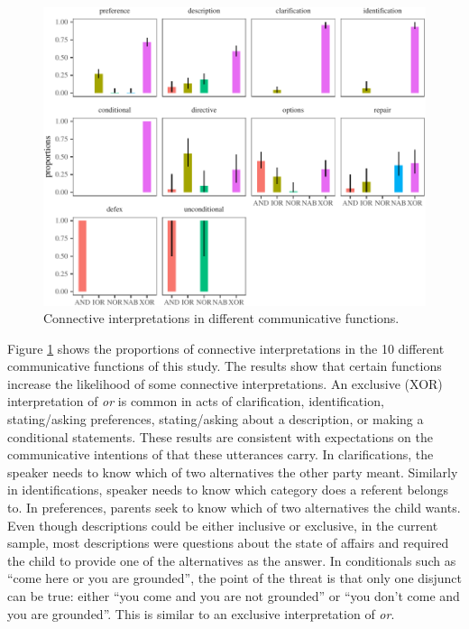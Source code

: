 \documentclass[floatsintext,man]{apa6}
\theoremstyle{definition}
\theoremstyle{definition}
\theoremstyle{definition}
\theoremstyle{remark}
\begin{document}
\begin{figure}[tb]

{\centering \includegraphics{figs/speechActPlot-1} 

}

\caption{Connective interpretations in different communicative functions.}\label{fig:speechActPlot}
\end{figure}

Figure \ref{fig:speechActPlot} shows the proportions of connective
interpretations in the 10 different communicative functions of this
study. The results show that certain functions increase the likelihood
of some connective interpretations. An exclusive (XOR) interpretation of
\emph{or} is common in acts of clarification, identification,
stating/asking preferences, stating/asking about a description, or
making a conditional statements. These results are consistent with
expectations on the communicative intentions of that these utterances
carry. In clarifications, the speaker needs to know which of two
alternatives the other party meant. Similarly in identifications,
speaker needs to know which category does a referent belongs to. In
preferences, parents seek to know which of two alternatives the child
wants. Even though descriptions could be either inclusive or exclusive,
in the current sample, most descriptions were questions about the state
of affairs and required the child to provide one of the alternatives as
the answer. In conditionals such as \enquote{come here or you are
grounded}, the point of the threat is that only one disjunct can be
true: either \enquote{you come and you are not grounded} or \enquote{you
don't come and you are grounded}. This is similar to an exclusive
interpretation of \emph{or}.
\end{document}
